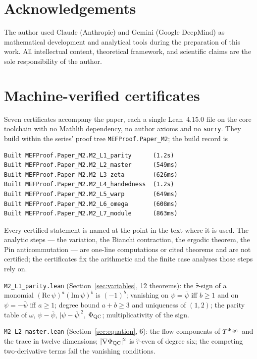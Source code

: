 \documentclass[11pt,a4paper]{article}
\theoremstyle{plain}
\theoremstyle{definition}
\theoremstyle{remark}
\begin{document}
\section*{Acknowledgements}
The author used Claude (Anthropic) and Gemini (Google DeepMind) as mathematical development and analytical tools during the preparation of this work. All intellectual content, theoretical framework, and scientific claims are the sole responsibility of the author.

\appendix

\section{Machine-verified certificates}\label{app:lean}

Seven certificates accompany the paper, each a single Lean~4.15.0 file on the
core toolchain with no Mathlib dependency, no author axioms and no
\texttt{sorry}. They build within the series' proof tree
\texttt{MEFProof.Paper\_M2}; the build record is
\begin{lstlisting}
Built MEFProof.Paper_M2.M2_L1_parity      (1.2s)
Built MEFProof.Paper_M2.M2_L2_master      (549ms)
Built MEFProof.Paper_M2.M2_L3_zeta        (626ms)
Built MEFProof.Paper_M2.M2_L4_handedness  (1.2s)
Built MEFProof.Paper_M2.M2_L5_warp        (649ms)
Built MEFProof.Paper_M2.M2_L6_omega       (608ms)
Built MEFProof.Paper_M2.M2_L7_module      (863ms)
\end{lstlisting}
Every certified statement is named at the point in the text where it is
used. The analytic steps --- the variation, the Bianchi contraction, the
ergodic theorem, the Pin anticommutation --- are one-line computations or
cited theorems and are not certified; the certificates fix the arithmetic
and the finite case analyses those steps rely on.

\texttt{M2\_L1\_parity.lean} (Section~\ref{sec:variables}, 12 theorems):
the $\hat\tau$-sign of a monomial $(\mathrm{Re}\,\psi)^{a}(\mathrm{Im}\,\psi)^{b}$
is $(-1)^{b}$; vanishing on $\psi=\bar\psi$ iff $b\ge1$ and on $\psi=-\bar\psi$
iff $a\ge1$; degree bound $a+b\ge3$ and uniqueness of $(1,2)$; the parity
table of $\omega$, $\psi-\bar\psi$, $\lvert\psi-\bar\psi\rvert^{2}$, $\Phi_{\mathrm{QC}}$;
multiplicativity of the sign.

\texttt{M2\_L2\_master.lean} (Section~\ref{sec:equation}, 6): the flow
components of $T^{\Phi_{\mathrm{QC}}}$ and the trace in twelve dimensions; $\lvert\nabla\Phi_{\mathrm{QC}}\rvert^{2}$
is $\hat\tau$-even of degree six; the competing two-derivative terms fail
the vanishing conditions.
\end{document}

